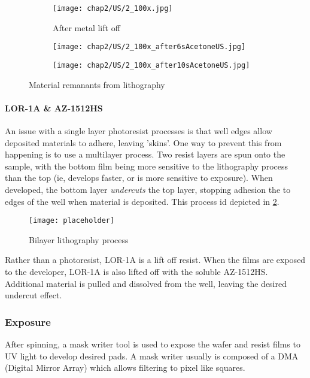 \documentclass[../../Matt_Gebert_Honours_Thesis.tex]{subfiles}
\begin{document}
	
	\begin{figure}[H]
		\centering
		\begin{subfigure}[b]{0.3\textwidth}
			\texttt{[image: chap2/US/2\_100x.jpg]}
			\caption{After metal lift off}			
		\end{subfigure}
		\begin{subfigure}[b]{0.3\textwidth}
			\texttt{[image: chap2/US/2\_100x\_after6sAcetoneUS.jpg]}
		\end{subfigure}
		\begin{subfigure}[b]{0.3\textwidth}
			\texttt{[image: chap2/US/2\_100x\_after10sAcetoneUS.jpg]}
		\end{subfigure}
		\caption{Material remanants from lithography}\label{fig:lithography_skins_us}
	\end{figure}
	
	\paragraph{LOR-1A \& AZ-1512HS}
	An issue with a single layer photoresist processes is that well edges allow deposited materials to adhere, leaving 'skins'. One way to prevent this from happening is to use a multilayer process. Two resist layers are spun onto the sample, with the bottom film being more sensitive to the lithography process than the top (ie, develops faster, or is more sensitive to exposure). When developed, the bottom layer \textit{undercuts} the top layer, stopping adhesion the to edges of the well when material is deposited. This process id depicted in \cref{fig:bilayer_lithography}.
	
	\begin{figure}[H]
		\centering
		\texttt{[image: placeholder]}
		\caption{Bilayer lithography process}\label{fig:bilayer_lithography}
	\end{figure}
	
	Rather than a photoresist, LOR-1A is a lift off resist. When the films are exposed to the developer, LOR-1A is also lifted off with the soluble AZ-1512HS. Additional material is pulled and dissolved from the well, leaving the desired undercut effect. %
	
	\subsubsection{Exposure}\label{sec:exposure}
	After spinning, a mask writer tool is used to expose the wafer and resist films to UV light to develop desired pads. A mask writer usually is composed of a DMA (Digital Mirror Array) which allows filtering to pixel like squares. %
	
\end{document}
